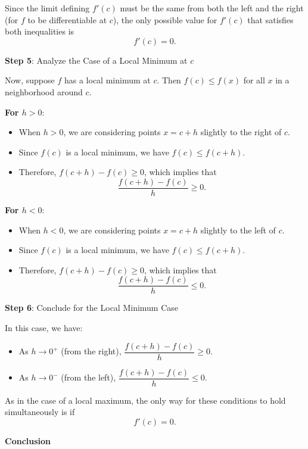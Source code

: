 \documentclass[a4paper,12pt]{book}
\begin{document}
Since the limit defining \( f'(c) \) must be the same from both the left and the right (for \( f \) to be differentiable at \( c \)), the only possible value for \( f'(c) \) that satisfies both inequalities is
\[
f'(c) = 0.
\]

\textbf{Step 5}: Analyze the Case of a Local Minimum at \( c \)

Now, suppose \( f \) has a local minimum at \( c \). Then \( f(c) \leqslant f(x) \) for all \( x \) in a neighborhood around \( c \).

\textbf{For \( h > 0 \)}:

\begin{itemize}
	\item 
	When \( h > 0 \), we are considering points \( x = c + h \) slightly to the right of \( c \).
	\item 
	Since \( f(c) \) is a local minimum, we have \( f(c) \leqslant f(c + h) \).
	\item 
	Therefore, \( f(c + h) - f(c) \geqslant 0 \), which implies that
	\[
	\dfrac{f(c + h) - f(c)}{h} \geqslant 0.
	\]	
\end{itemize}

\textbf{For \( h < 0 \)}:

\begin{itemize}
	\item 
	When \( h < 0 \), we are considering points \( x = c + h \) slightly to the left of \( c \).
	\item 
	Since \( f(c) \) is a local minimum, we have \( f(c) \leqslant f(c + h) \).
	\item 
	Therefore, \( f(c + h) - f(c) \geqslant 0 \), which implies that
	\[
	\dfrac{f(c + h) - f(c)}{h} \leqslant 0.
	\]
\end{itemize}

\textbf{Step 6}: Conclude for the Local Minimum Case

In this case, we have:

\begin{itemize}
	\item 
	As \( h \to 0^+ \) (from the right), \( \dfrac{f(c + h) - f(c)}{h} \geqslant 0 \).
	\item 
	As \( h \to 0^- \) (from the left), \( \dfrac{f(c + h) - f(c)}{h} \leqslant 0 \).
\end{itemize}

As in the case of a local maximum, the only way for these conditions to hold simultaneously is if
\[
f'(c) = 0.
\]

\textbf{Conclusion}
\end{document}
